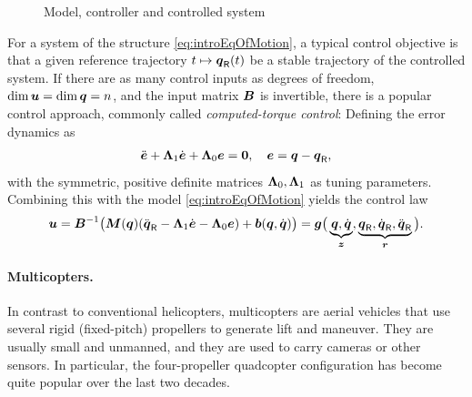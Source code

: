 \begin{figure}[ht]
 \centering
 \newcommand{\macCtrlBlockKinetics}{$\dot{\sysState} = \tuple{f}(\sysState,\sysInput)$}
 \newcommand{\macCtrlBlockCtrl}{$\sysInput = \tuple{g}(\sysState, \tuple{r})$}
 \newcommand{\macControlBlockClosedLoopKinetics}{$\dot{\sysState} = \bar{\tuple{f}}(\sysState,\tuple{r})$}
 \newcommand{\macCtrlBlockMeas}{$\sysState$}
 \newcommand{\macCtrlBlockInput}{$\sysInput$}
 \newcommand{\macCtrlBlockRef}{$\tuple{r}$}
 \newcommand{\macCtrlBlockInitials}{$\sysState(t_0)$}
 
 \caption{Model, controller and controlled system}
 \label{fig:introCtrlBlock}
\end{figure}

For a system of the structure \eqref{eq:introEqOfMotion}, a typical control objective is that a given reference trajectory $t \mapsto \boldsymbol{q}_{\mathsf{R}}(t)$ be a stable trajectory of the controlled system.
If there are as many control inputs as degrees of freedom, $\dim\boldsymbol{u} = \dim\boldsymbol{q} = n$, and the input matrix $\boldsymbol{B}$ is invertible, there is a popular control approach, commonly called \textit{computed-torque control}:
Defining the error dynamics as
\begin{align}
 \ddot{\boldsymbol{e}} + \boldsymbol{\Lambda}_1 \dot{\boldsymbol{e}} + \boldsymbol{\Lambda}_0 \boldsymbol{e} = \boldsymbol{0}, \quad \boldsymbol{e} = \boldsymbol{q} - \boldsymbol{q}_{\mathsf{R}},
\end{align}
with the symmetric, positive definite matrices $\boldsymbol{\Lambda}_0, \boldsymbol{\Lambda}_1$ as tuning parameters.
Combining this with the model \eqref{eq:introEqOfMotion} yields the control law
\begin{align}\label{eq:IntroComputedTorque}
 \boldsymbol{u} = \boldsymbol{B}^{-1} \big( \boldsymbol{M}(\boldsymbol{q})(\ddot{\boldsymbol{q}}_{\mathsf{R}} - \boldsymbol{\Lambda}_1 \dot{\boldsymbol{e}} - \boldsymbol{\Lambda}_0 \boldsymbol{e}) + \boldsymbol{b}(\boldsymbol{q},\dot{\boldsymbol{q}}) \big)
 = \boldsymbol{g}\big( \underbrace{\boldsymbol{q}, \dot{\boldsymbol{q}}}_{\boldsymbol{z}}, \underbrace{\boldsymbol{q}_{\mathsf{R}}, \dot{\boldsymbol{q}}_{\mathsf{R}}, \ddot{\boldsymbol{q}}_{\mathsf{R}}}_{\boldsymbol{r}} \big).
\end{align}

\paragraph{Multicopters.}
In contrast to conventional helicopters, multicopters are aerial vehicles that use several rigid (fixed-pitch) propellers to generate lift and maneuver.
They are usually small and unmanned, and they are used to carry cameras or other sensors.
In particular, the four-propeller quadcopter configuration has become quite popular over the last two decades.

